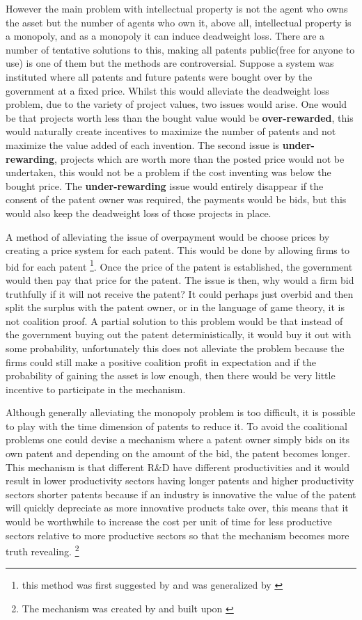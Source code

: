 \documentclass[12pt]{article}
\numberwithin{equation}{section}
\begin{document}
However the main problem with intellectual property is not the agent who owns the asset but the number of agents who own it, above all, intellectual property is a monopoly, and as a monopoly it can induce deadweight loss. There are a number of tentative solutions to this, making all patents public(free for anyone to use) is one of them but the methods are controversial. Suppose a system was instituted where all patents and future patents were bought over by the government at a fixed price. Whilst this would alleviate the deadweight loss problem, due to the variety of project values, two issues would arise. One would be that projects worth less than the bought value would be \textbf{over-rewarded}, this would naturally create incentives to maximize the number of patents and not maximize the value added of each invention. The second issue is \textbf{under-rewarding}, projects which are worth more than the posted price would not be undertaken, this would not be a problem if the cost inventing was below the bought price. The \textbf{under-rewarding} issue would entirely disappear if the consent of the patent owner was required, the payments would be bids, but this would also keep the deadweight loss of those projects in place.

A method of alleviating the issue of overpayment would be choose prices by creating a price system for each patent. This would be done by allowing firms to bid for each patent \footnote{this method was first suggested by\cite{kremer_1998} and was generalized by \cite{weyl2012market}}. Once the price of the patent is established, the government would then pay that price for the patent. The issue is then, why would a firm bid truthfully if it will not receive the patent? It could perhaps just overbid and then split the surplus with the patent owner, or in the language of game theory, it is not coalition proof. A partial solution to this problem would be that instead of the government buying out the patent deterministically, it would buy it out with some probability, unfortunately this does not alleviate the problem because the firms could still make a positive coalition profit in expectation and if the probability of gaining the asset is low enough, then there would be very little incentive to participate in the mechanism.

Although generally alleviating the monopoly problem is too difficult, it is possible to play with the time dimension of patents to reduce it. To avoid the coalitional problems one could devise a mechanism where a patent owner simply bids on its own patent and depending on the amount of the bid, the patent becomes longer. This mechanism is that different R\&D have different productivities and it would result in lower productivity sectors having longer patents and higher productivity sectors shorter patents because if an industry is innovative the value of the patent will quickly depreciate as more innovative products take over, this means that it would be worthwhile to increase the cost per unit of time for less productive sectors relative to more productive sectors so that the mechanism becomes more truth revealing.  \footnote{ The mechanism was created by \cite{Scotchmer1999} and built upon \cite{Cornelli1999}}
\end{document}
